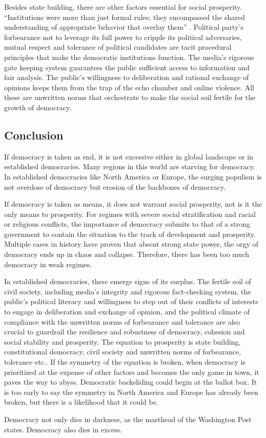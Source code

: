 \documentclass{scrartcl}
\begin{document}
Besides state building, there are other factors essential for social
prosperity. ``Institutions were more than just formal rules; they
encompassed the shared understanding of appropriate behavior that
overlay them'' \autocite[213]{demdie}. Political party's forbearance
not to leverage its full power to cripple its political adversaries,
mutual respect and tolerance of political candidates are tacit procedural
principles that make the democratic institutions function. The media's
rigorous gate keeping system guarantees the public sufficient access
to information and fair analysis. The public's willingness to deliberation
and rational exchange of opinions keeps them from the trap of the
echo chamber and online violence. All these are unwritten norms that
orchestrate to make the social soil fertile for the growth of democracy.

\bigskip{}


\subsection*{Conclusion}

If democracy is taken as end, it is not excessive either in global
landscape or in established democracies. Many regions in this world
are starving for democracy. In established democracies like North
America or Europe, the surging populism is not overdose of democracy
but erosion of the backbones of democracy. 

If democracy is taken as means, it does not warrant social prosperity,
not is it the only means to prosperity. For regimes with severe social
stratification and racial or religious conflicts, the importance of
democracy submits to that of a strong government to contain the situation
to the track of development and prosperity. Multiple cases in history
have proven that absent strong state power, the orgy of democracy
ends up in chaos and collapse. Therefore, there has been too much
democracy in weak regimes. 

In established democracies,
 there emerge signs of its surplus.
 The fertile soil of civil society,
including media's integrity and
rigorous fact-checking system, the public's political literacy and
willingness to step out of their conflicts of interests to engage
in deliberation and exchange of opinion, and the political climate
of compliance with the unwritten norms of forbearance and tolerance
are also crucial to guardrail the resilience and robustness of democracy,
cohesion and social stability and prosperity. The equation to prosperity
is state building, constitutional democracy, civil society and unwritten
norms of forbearance, tolerance etc.. If the symmetry of the equation
is broken, when democracy is prioritized at the expense of other factors
and becomes the only game in town, it paves the way to abyss. Democratic
backsliding could begin at the ballot box. 
It is too early to say
the symmetry in North America and Europe has already been broken,
but there is a likelihood that it could be.

Democracy not only dies in darkness,
 as the masthead of the Washington Post states.
 Democracy also dies in excess.

\printbibliography[heading=bibintoc]
\end{document}
